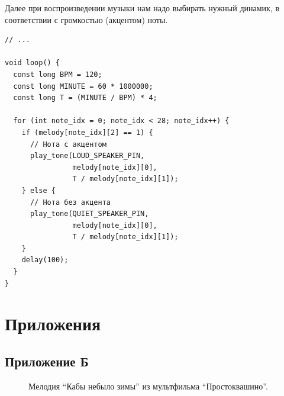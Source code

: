 \documentclass[a4paper,twoside]{book}
\begin{document}
Далее при воспроизведении музыки нам надо выбирать нужный динамик, в
соответствии с громкостью (акцентом) ноты.

\begin{verbatim}
// ...

void loop() {
  const long BPM = 120;
  const long MINUTE = 60 * 1000000;
  const long T = (MINUTE / BPM) * 4;

  for (int note_idx = 0; note_idx < 28; note_idx++) {
    if (melody[note_idx][2] == 1) {
      // Нота с акцентом
      play_tone(LOUD_SPEAKER_PIN,
                melody[note_idx][0],
                T / melody[note_idx][1]);
    } else {
      // Нота без акцента
      play_tone(QUIET_SPEAKER_PIN,
                melody[note_idx][0],
                T / melody[note_idx][1]);
    }
    delay(100);
  }
}
\end{verbatim}



\printglossaries

\chapter*{Приложения}



\newpage
\section{Приложение Б}

\begin{figure}[ht]
  \caption{Мелодия ``Кабы небыло зимы'' из мультфильма ``Простоквашино''.}
  \label{fig:lilypond-melody-prostokvashino-full}
\end{figure}
\end{document}
